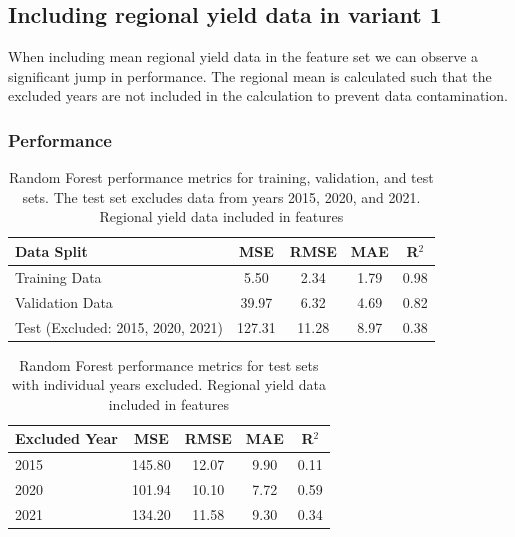 \documentclass{article}
\begin{document}
\subsection{Including regional yield data in variant 1}
When including mean regional yield data in the feature set we can observe a significant jump in performance.
The regional mean is calculated such that the excluded years are not included in the calculation to prevent data contamination.
\subsubsection{Performance}
\begin{table}[H]
	\centering
	\begin{tabular}{lcccc}
		\hline
		Data Split                        & MSE    & RMSE  & MAE  & R$^2$ \\
		\hline
		Training Data                     & 5.50   & 2.34  & 1.79 & 0.98  \\
		Validation Data                   & 39.97  & 6.32  & 4.69 & 0.82  \\
		Test (Excluded: 2015, 2020, 2021) & 127.31 & 11.28 & 8.97 & 0.38  \\
		\hline
	\end{tabular}
	\caption{Random Forest performance metrics for training, validation, and test sets. The test set excludes data from years 2015, 2020, and 2021. Regional yield data included in features}
\end{table}

\begin{table}[H]
	\centering
	\begin{tabular}{lcccc}
		\hline
		Excluded Year & MSE    & RMSE  & MAE  & R$^2$ \\
		\hline
		2015          & 145.80 & 12.07 & 9.90 & 0.11  \\
		2020          & 101.94 & 10.10 & 7.72 & 0.59  \\
		2021          & 134.20 & 11.58 & 9.30 & 0.34  \\
		\hline
	\end{tabular}
	\caption{Random Forest performance metrics for test sets with individual years excluded. Regional yield data included in features}
\end{table}
\end{document}
